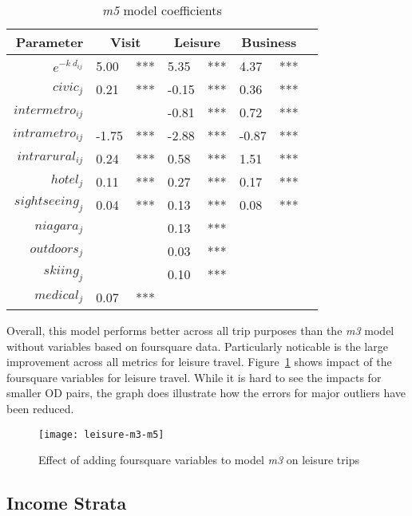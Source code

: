\begin{table}[H]
\centering
\caption{\textit{m5} model coefficients}
\label{table:m5-coeff}
\begin{tabular}{@{}rlrlrlrl@{}}
  \toprule
 Parameter & \multicolumn{2}{c}{Visit} & \multicolumn{2}{c}{Leisure} & \multicolumn{2}{c}{Business} &  \\ \midrule
  $e^{-k\ d_{ij}}$ & 5.00 & *** & 5.35 & *** & 4.37 & *** \\ 
  $civic_j$ & 0.21 & *** & -0.15 & *** & 0.36 & *** \\ 
  $intermetro_{ij}$ &  &  & -0.81 & *** & 0.72 & *** \\ 
  $intrametro_{ij}$  & -1.75 & *** & -2.88 & *** & -0.87 & *** \\   
  $intrarural_{ij}$  & 0.24 & *** & 0.58 & *** & 1.51 & *** \\ 
  $hotel_j$ & 0.11 & *** & 0.27 & *** & 0.17 & *** \\ 
  $sightseeing_j$  & 0.04 & *** & 0.13 & *** & 0.08 & *** \\ 
  $niagara_j$&  &  & 0.13 & *** &  &  \\ 
  $outdoors_j$ &  &  & 0.03 & *** &  &  \\ 
  $skiing_j$ &  &  & 0.10 & *** &  &  \\ 
  $medical_j$  & 0.07 & *** &  &  &  &  \\ 
   \bottomrule
\end{tabular}
\end{table}

Overall, this model performs better across all trip purposes than the \textit{m3} model without variables based on foursquare data. Particularly noticable is the large improvement across all metrics for leisure travel. Figure~\ref{fig:leisure-m3-m5} shows impact of the foursquare variables for leisure travel. While it is hard to see the impacts for smaller OD pairs, the graph does illustrate how the errors for major outliers have been reduced. 

\begin{figure}[H]
\centering
\texttt{[image: leisure-m3-m5]}
\caption{Effect of adding foursquare variables to model \textit{m3} on leisure trips}
\label{fig:leisure-m3-m5}
\end{figure}


\subsection{Income Strata}



